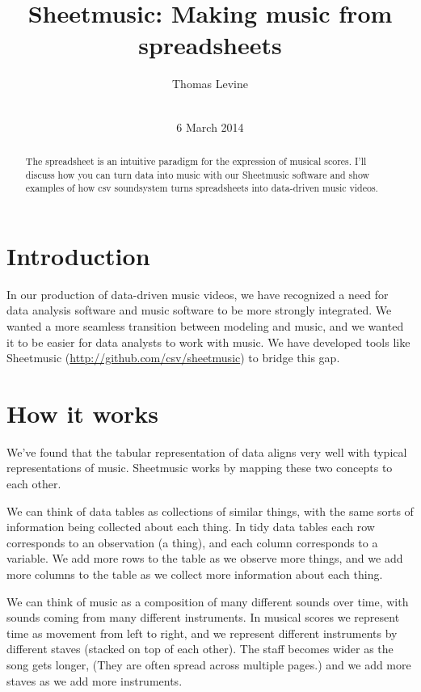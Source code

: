 \documentclass{acm_proc_article-sp}
\begin{document}
\title{Sheetmusic: Making music from spreadsheets}
\author{
\alignauthor
Thomas Levine\\
       \\
}
\date{6 March 2014}
\maketitle
\begin{abstract}
The spreadsheet is an intuitive paradigm for the expression of musical
scores. I'll discuss how you can turn data into music with our Sheetmusic
software and show examples of how csv soundsystem turns spreadsheets
into data-driven music videos.
\end{abstract}
\section{Introduction}
In our production of data-driven music videos, we have recognized a need
for data analysis software and music software to be more strongly integrated.
We wanted a more seamless transition between modeling and music, and we
wanted it to be easier for data analysts to work with music. We have
developed tools like Sheetmusic (\url{http://github.com/csv/sheetmusic})
to bridge this gap.

\section{How it works}
We've found that the tabular representation of data aligns very well with
typical representations of music. Sheetmusic works by mapping these two
concepts to each other.

We can think of data tables as collections of similar things, with the
same sorts of information being collected about each thing. In tidy data
tables \cite{tidydata} each row corresponds to an observation (a thing),
and each column corresponds to a variable. We add more rows to the table
as we observe more things, and we add more columns to the table as we
collect more information about each thing.

We can think of music as a composition of many different sounds over time,
with sounds coming from many different instruments. In musical scores
we represent time as movement from left to right, and we represent different
instruments by different staves (stacked on top of each other).
The staff becomes wider as the song gets longer, (They are often spread
across multiple pages.) and we add more staves as we add more instruments.
\end{document}
